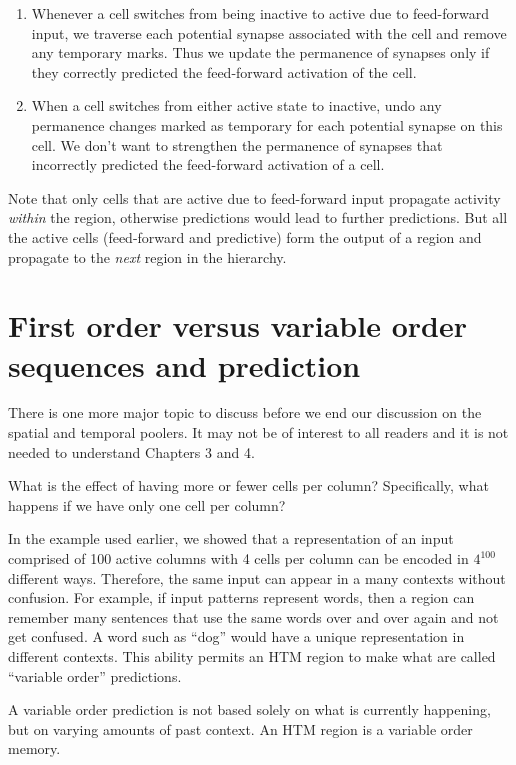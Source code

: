 \documentclass{report}
\begin{document}
\begin{enumerate}
\item Whenever a cell switches from being inactive to active due to
  feed-forward input, we traverse each potential synapse associated
  with the cell and remove any temporary marks. Thus we update the
  permanence of synapses only if they correctly predicted the
  feed-forward activation of the cell.

\item When a cell switches from either active state to inactive, undo
  any permanence changes marked as temporary for each potential
  synapse on this cell. We don't want to strengthen the permanence of
  synapses that incorrectly predicted the feed-forward activation of a
  cell.
\end{enumerate}

Note that only cells that are active due to feed-forward input
propagate activity {\em within} the region, otherwise predictions
would lead to further predictions. But all the active cells
(feed-forward and predictive) form the output of a region and
propagate to the {\em next} region in the hierarchy.

\section*{First order versus variable order sequences and prediction}

There is one more major topic to discuss before we end our discussion
on the spatial and temporal poolers. It may not be of interest to all
readers and it is not needed to understand Chapters 3 and 4.

What is the effect of having more or fewer cells per column?
Specifically, what happens if we have only one cell per column?

In the example used earlier, we showed that a representation of an
input comprised of 100 active columns with 4 cells per column can be
encoded in $4^{100}$ different ways. Therefore, the same input can
appear in a many contexts without confusion. For example, if input
patterns represent words, then a region can remember many sentences
that use the same words over and over again and not get confused. A
word such as ``dog'' would have a unique representation in different
contexts. This ability permits an HTM region to make what are called
``variable order'' predictions.

A variable order prediction is not based solely on what is currently
happening, but on varying amounts of past context. An HTM region is a
variable order memory.
\end{document}
